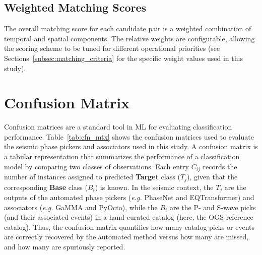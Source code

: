 \subsection{Weighted Matching Scores}
The overall matching score for each candidate pair is a weighted combination
of temporal and spatial components. The relative weights are configurable,
allowing the scoring scheme to be tuned for different operational priorities
(see Sections~\ref{subsec:matching_criteria} for the specific weight values
used in this study).

\section{Confusion Matrix}
Confusion matrices are a standard tool in \ac{ML} for evaluating classification
performance. Table~\ref{tab:cfn_mtx} shows the confusion matrices used to
evaluate the seismic phase pickers and associators used in this
study. A confusion matrix is a tabular representation that summarizes the
performance of a classification model by comparing two classes of observations.
Each entry $C_{ij}$ records the number of instances assigned to predicted
\textbf{Target} class ($T_j$), given that the corresponding \textbf{Base} class
($B_i$) is known. In the seismic context, the $T_j$ are the outputs of the
automated phase pickers (\textit{e.g.} PhaseNet and EQTransformer) and
associators (\textit{e.g.} GaMMA and PyOcto), while the $B_i$ are the P- and
S-wave picks (and their associated events) in a hand-curated catalog (here, the
OGS reference catalog). Thus, the confusion matrix quantifies how many catalog
picks or events are correctly recovered by the automated method versus how many
are missed, and how many are spuriously reported.

